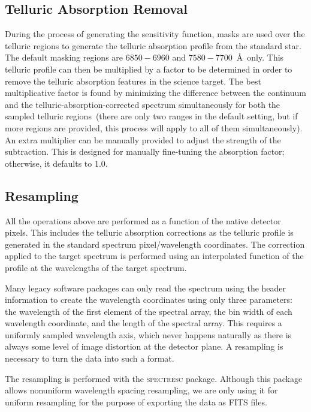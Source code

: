 \documentclass[linenumbers, twocolumn]{aastex631}
\begin{document}
\subsection{Telluric Absorption Removal}
During the process of generating the sensitivity function, masks are used
over the telluric regions to generate the telluric absorption
profile from the standard star. The default masking regions are $6850-6960$
and $7580-7700$\ \AA\ only. This telluric profile can then be multiplied
by a factor to be determined in order to remove the telluric absorption
features in the science target. The best multiplicative factor is found
by minimizing the difference between the continuum and the
telluric-absorption-corrected spectrum simultaneously for both the sampled
telluric regions~(there are only two ranges in the default setting, but if more regions are
provided, this process will apply to all of them simultaneously).
An extra multiplier can be manually provided to adjust the
strength of the subtraction. This is designed for manually fine-tuning the
absorption factor; otherwise, it defaults to $1.0$.

\subsection{Resampling}
All the operations above are performed as a function of the native detector
pixels. This includes the telluric absorption corrections as the telluric profile
is generated in the standard spectrum pixel/wavelength coordinates. The
correction applied to the target spectrum is performed using an interpolated
function of the profile at the wavelengths of the target spectrum. 

Many legacy software packages can only read the spectrum using the header information to create
the wavelength coordinates using only three parameters: the wavelength of the
first element of the spectral array, the bin width of each wavelength
coordinate, and the length of the spectral array. This requires a uniformly
sampled wavelength axis, which never happens naturally as there is always some
level of image distortion at the detector plane. A resampling is necessary
to turn the data into such a format.

The resampling is performed with the \textsc{spectresc} package. Although
this package allows nonuniform wavelength spacing resampling, we are only
using it for uniform resampling for the purpose of exporting the data as FITS
files.
\end{document}

